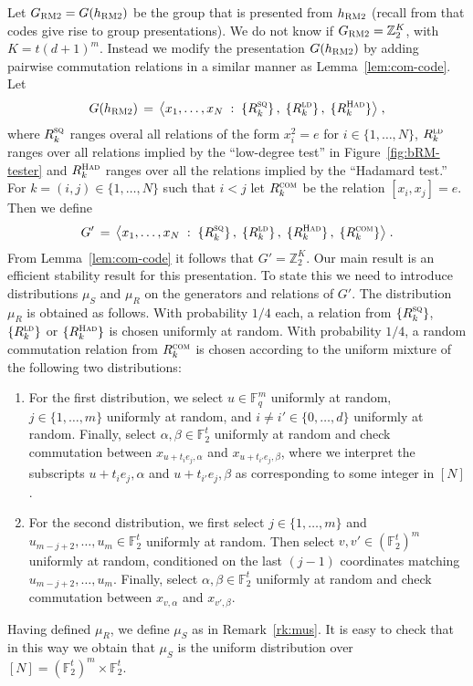 \documentclass[11pt]{article}
\theoremstyle{definition}
\newcommand{\F}{\ensuremath{\mathbb{F}}}
\newcommand{\ld}{\textsc{ld}}
\newcommand{\com}{\textsc{com}}
\newcommand{\sq}{\textsc{sq}}
\newcommand{\Z}{\ensuremath{\mathbb{Z}}}
\newcommand{\bRM}{\ensuremath{\textsc{RM2}}}
\newcommand{\had}{\textsc{Had}}
\begin{document}
Let $G_\bRM = G(h_\bRM)$ be the group that is presented from $h_\bRM$ (recall from  that codes give rise to group presentations). We do not know if $G_\bRM = \Z_2^K$, with $K=t(d+1)^m$. Instead we modify the presentation $G(h_\bRM)$ by adding pairwise commutation relations in a similar manner as Lemma~\ref{lem:com-code}. Let 
\[ G(h_\bRM) \,=\, \big\langle x_1,\ldots,x_N \;:\; \{R^\sq_k\}\,,\; \{R^\ld_k\}\,,\; \{R^\had_{k}\} \big\rangle\;,\]
where  $R^\sq_k$ ranges overal all relations of the form $x_i^2=e$ for $i\in \{1,\ldots,N\}$, $R^\ld_k$ ranges over all relations implied by the ``low-degree test'' in Figure~\ref{fig:bRM-tester} and $R^\had_{k}$ ranges over all the relations implied by the ``Hadamard test.'' For $k=(i,j)\in\{1,\ldots,N\}$ such that $i<j$ let $R^\com_k$ be the relation $[x_i,x_j]=e$.
Then we define
\begin{equation}\label{eq:z2k-eff}
 G' \,=\,\big\langle x_1,\ldots,x_N \;:\; \{R^\sq_k\}\,,\; \{R^\ld_k\}\,,\; \{R^\had_{k}\}\, , \; \{ R^\com_k\}\big\rangle\;.
\end{equation}
From Lemma~\ref{lem:com-code} it follows that $G'=\Z_2^K$. Our main result is an efficient stability result for this presentation. To state this we need to introduce distributions $\mu_S$ and $\mu_R$ on the generators and relations of $G'$. The distribution $\mu_R$ is obtained as follows. With probability $1/4$ each, a relation from $\{R^\sq_k\}$, $\{R^\ld_k\}$ or $\{R^\had_k\}$ is chosen uniformly at random. With probability $1/4$, a random commutation relation from $R^\com_k$ is chosen according to the uniform mixture of the following two distributions:
\begin{enumerate}
\item For the first distribution, we select $u\in \F_q^m$ uniformly at random, $j\in\{1,\ldots,m\}$ uniformly at random, and $i\neq i'\in\{0,\ldots,d\}$ uniformly at random. Finally, select $\alpha,\beta\in \F_2^t$ uniformly at random and check commutation between $x_{u+t_i e_j,\alpha}$ and $x_{u+t_{i'} e_j,\beta}$, where we interpret the subscripts  $u+t_i e_j,\alpha$ and $u+t_{i'} e_j,\beta$ as corresponding to some integer in $[N]$. 

\item For the second distribution, we first select $j\in\{1,\ldots,m\}$ and $u_{m-j+2},\ldots,u_m \in \F_2^t$ uniformly at random. Then select $v,v' \in (\F_2^t)^m$ uniformly at random, conditioned on the last $(j-1)$ coordinates matching $u_{m-j+2},\ldots,u_m$. Finally, select $\alpha,\beta\in \F_2^t$ uniformly at random and check commutation between $x_{v,\alpha}$ and $x_{v',\beta}$. 
\end{enumerate}
Having defined $\mu_R$, we define $\mu_S$ as in Remark~\ref{rk:mus}. It is easy to check that in this way we obtain that $\mu_S$ is the uniform distribution over $[N] = (\F_2^t)^m \times \F_2^t$. 
\end{document}
